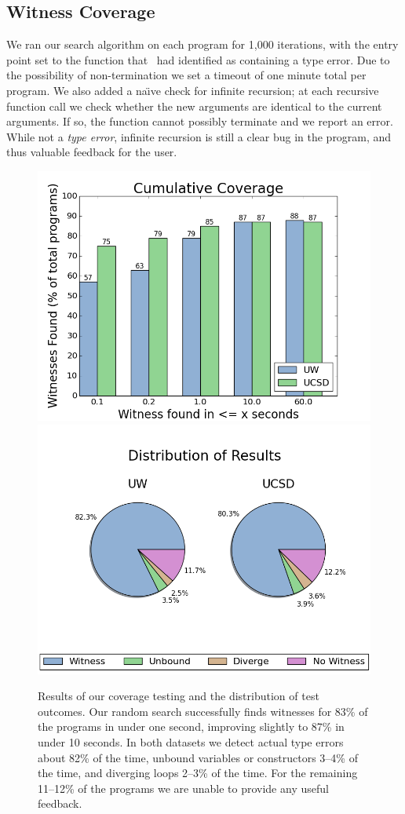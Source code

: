 \subsection{Witness Coverage}
\label{sec:eval:witness-coverage}
%
We ran our search algorithm on each program for 1,000 iterations, with
the entry point set to the function that \ocaml\ had identified as
containing a type error.
%
Due to the possibility of non-termination we set a timeout of one minute
total per program.
%
%
We also added a na{\"\i}ve check for infinite recursion; at each recursive
function call we check whether the new arguments are identical to the
current arguments.
%
If so, the function cannot possibly terminate and we report an error.
%
While not a \emph{type error}, infinite recursion is still a clear bug
in the program, and thus valuable feedback for the user.

\begin{figure}[t]
\centering
\begin{minipage}{\linewidth}
\centering
\includegraphics[width=0.49\linewidth]{coverage.png}
\includegraphics[width=0.49\linewidth]{distrib.png}
\end{minipage}
\caption{Results of our coverage testing and the distribution of test
  outcomes. Our random search successfully finds witnesses for 83\% of
  the programs in under one second, improving slightly to 87\% in under
  10 seconds. In both datasets we detect actual type errors about 82\%
  of the time, unbound variables or constructors 3--4\% of the time, and
  diverging loops 2--3\% of the time. For the remaining 11--12\% of the
  programs we are unable to provide any useful feedback.  }
\label{fig:results-witness}
\end{figure}


